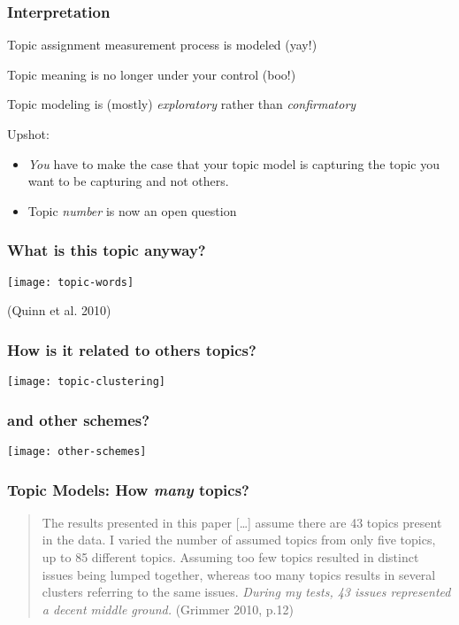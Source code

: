 \documentclass[11pt,compress,professionalfonts]{beamer}
\newcommand{\ita}{\begin{itemize}}
\newcommand{\itm}{\item[]}
\newcommand{\itz}{\end{itemize}}
\begin{document}
\begin{frame}[t,fragile]\frametitle{Interpretation}

Topic assignment measurement process is modeled  (yay!)

Topic meaning is no longer under your control (boo!)

Topic modeling is (mostly) \textit{exploratory} rather than \textit{confirmatory}

Upshot:
\ita
\itm \textit{You} have to make the case that your topic model is capturing the topic you want to be capturing and not others.
\itm Topic \textit{number} is now an open question
\itz

\end{frame}
\begin{frame}[t,fragile]\frametitle{What is this topic anyway?}

\centerline{\texttt{[image: topic-words]}}

{\footnotesize (Quinn et al. 2010)}

\end{frame}
\begin{frame}[t,fragile]\frametitle{How is it related to others topics?}

\centerline{\texttt{[image: topic-clustering]}}

\end{frame}
\begin{frame}[t,fragile]\frametitle{and other schemes?}

\centerline{\texttt{[image: other-schemes]}}

%
%
%
%
%

\end{frame}
\begin{frame}[t,fragile]\frametitle{Topic Models: How \textit{many} topics?}

{\small
\begin{quote}
The results presented in this paper [\ldots] assume there are 43 topics present in the data. I varied the number of assumed topics from only five topics, up to 85 different topics. Assuming too few topics resulted in distinct issues being lumped together, whereas too many topics results in several clusters referring to the same issues. \textsl{During my tests, 43 issues represented a decent middle ground.}
(Grimmer 2010, p.12)
\end{quote}
}

\end{frame}
\end{document}
